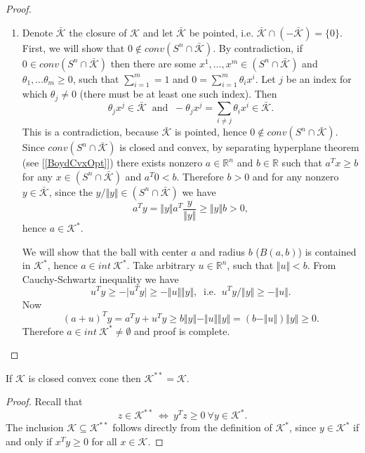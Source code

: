 \documentclass[12pt]{book}
\theoremstyle{definition}
\begin{document}
\begin{appendix}
\begin{proof}
\begin{enumerate}
\item Denote $\bar{\mathcal{K}}$ the closure of $\mathcal{K}$ and let $\bar{\mathcal{K}}$ be pointed, i.e. 
$\bar{\mathcal{K}} \cap \left(-\bar{\mathcal{K}}\right) = \{0\}$. First, we will show that $0\notin conv(S^n\cap \bar{\mathcal{K}}).$ By contradiction, if $0\in conv(S^n\cap \bar{\mathcal{K}})$ then there are some 
$x^1,\dots ,x^m \in \left(S^n\cap \bar{\mathcal{K}}\right)$ and 
$\theta_1,\dots \theta_m \geq 0$, such that $\sum_{i=1}^m = 1$ and $ 0 = \sum_{i=1}^m \theta_ix^i$.
Let $j$ be an index for which $\theta_j\neq 0$ (there must be at least one such index). Then 
\begin{equation*}
\theta_jx^j \in \bar{\mathcal{K}} \ \mbox{ and } \ -\theta_jx^j= \sum_{i\neq j} \theta_ix^i \in \bar{\mathcal{K}}.
\end{equation*}
This is a contradiction, because  $\bar{\mathcal{K}}$ is pointed, hence $0\notin conv(S^n\cap \bar{\mathcal{K}}).$
Since $conv(S^n\cap \bar{\mathcal{K}})$ is closed and convex, by separating hyperplane theorem (see [\ref{BoydCvxOpt}]) there exists nonzero $a\in \mathbb{R}^n$ and $b\in \mathbb{R}$ such that 
$a^Tx \geq b$ for any $x\in (S^n\cap \bar{\mathcal{K}})$ and $a^T0<b$. Therefore $b>0$ and for any nonzero $y\in  \bar{\mathcal{K}}$, since the $y/\Vert y\Vert \in (S^n\cap \bar{\mathcal{K}})$
we have 
$$a^Ty = \Vert y \Vert a^T \frac{y}{\Vert y\Vert} \geq \Vert y\Vert b > 0,$$
hence $a\in \mathcal{K}^*$.  

We will show that the ball with center $a$ and radius $b$ ($B(a,b)$) is contained in $\mathcal{K}^*$, hence $a\in int \ \mathcal{K}^*$. Take arbitrary $u\in \mathbb{R}^n$, such that $\Vert u \Vert <b$. From Cauchy-Schwartz inequality we have
$$u^Ty \geq - \vert u^Ty \vert \geq -\Vert u \Vert \Vert y \Vert, \ \mbox{ i.e. } \ u^Ty/\Vert y \Vert \geq -\Vert u \Vert.$$ Now 
$$ (a+u)^Ty = a^Ty + u^Ty \geq b\Vert y \Vert - \Vert u \Vert \Vert y \Vert = (b - \Vert u \Vert)\Vert y \Vert\geq 0.$$
Therefore $a\in int\ \mathcal{K}^* \neq \emptyset$ and proof is complete.

\end{enumerate}
\end{proof}

\prop \label{PropSecondDualofClosedCOne} If $\mathcal{K}$ is closed convex cone then $\mathcal{K}^{**} = \mathcal{K}$.

\begin{proof}
Recall that 
$$ z \in \mathcal{K}^{**} \ \Leftrightarrow \  y^Tz \geq 0 \ \forall y\in \mathcal{K}^{*}.$$
The inclusion $\mathcal{K} \subseteq \mathcal{K}^{**}$ follows directly from the definition of $\mathcal{K}^{*}$, since $y\in\mathcal{K}^{*}$ if and only if $x^Ty\geq 0$ for all $x\in \mathcal{K}$. 


\end{proof}
\end{appendix}
\end{document}
